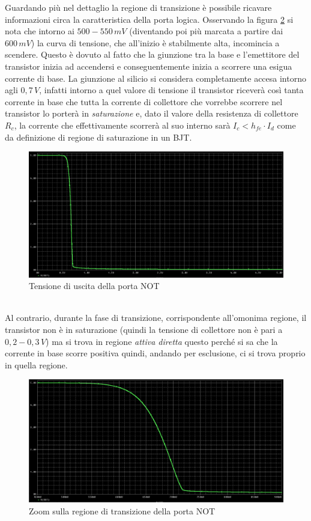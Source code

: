 \documentclass[12pt, a4paper]{report}
\begin{document}
Guardando più nel dettaglio la regione di transizione è possibile ricavare informazioni circa la caratteristica della porta logica. Osservando la figura \ref{not_transfer_zoom} si nota che intorno ai $500 - 550\,mV$ (diventando poi più marcata a partire dai $600\,mV$) la curva di tensione, che all'inizio è stabilmente alta, incomincia a scendere. Questo è dovuto al fatto che la giunzione tra la base e l'emettitore del transistor inizia ad accendersi e conseguentemente inizia a scorrere una esigua corrente di base. La giunzione al silicio si considera completamente accesa intorno agli $0,7\,V$, infatti intorno a quel valore di tensione il transistor riceverà così tanta corrente in base che tutta la corrente di collettore che vorrebbe scorrere nel transistor lo porterà in \textit{saturazione} e, dato il valore della resistenza di collettore $R_c$, la corrente che effettivamente scorrerà al suo interno sarà $I_{c} < h_{fe} \cdot I_{d}$ come da definizione di regione di saturazione in un BJT.
\begin{figure}[h]
    \centering
    \includegraphics[scale=0.35,angle=0]{rtl_not_transfer.png}
    \caption{Tensione di uscita della porta NOT}
    \label{not_transfer}
\end{figure}
\\Al contrario, durante la fase di transizione, corrispondente all'omonima regione, il transistor non è in saturazione (quindi la tensione di collettore non è pari a $0,2 - 0,3\,V$) ma si trova in regione \textit{attiva diretta} questo perché si sa che la corrente in base scorre positiva quindi, andando per esclusione, ci si trova proprio in quella regione.
\begin{figure}[h]
    \centering
    \includegraphics[scale=0.35,angle=0]{rtl_not_transfer_zoom.png}
    \caption{Zoom sulla regione di transizione della porta NOT}
    \label{not_transfer_zoom}
\end{figure}
\end{document}
